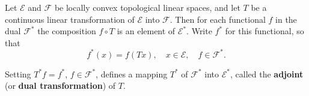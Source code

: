 Let $\mathcal{E}$ and $\mathcal{F}$ be locally convex topological linear spaces, and let $T$ be a continuous linear transformation of $\mathcal{E}$ into $\mathcal{F}$. Then for each functional $f$ in the dual $\mathcal{F}^*$ the composition $f \circ T$ is an element of $\mathcal{E}^*$. Write $f^*$ for this functional, so that
$$f^*(x) = f(Tx), \quad x \in \mathcal{E}, \quad f \in \mathcal{F}^*.$$

Setting $T^*f = f^*$, $f \in \mathcal{F}^*$, defines a mapping $T^*$ of $\mathcal{F}^*$ into $\mathcal{E}^*$, called the \textbf{adjoint} (or \textbf{dual transformation}) of $T$.
